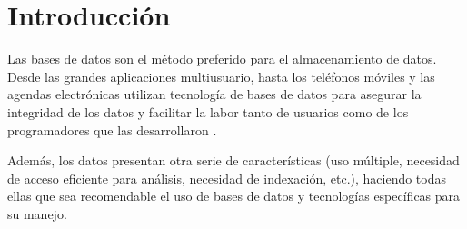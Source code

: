 \section{Introducción}

Las bases de datos son el método preferido para el almacenamiento de datos. Desde las grandes aplicaciones multiusuario, hasta los teléfonos
móviles y las agendas electrónicas utilizan tecnología de bases de datos para asegurar la integridad de los datos y facilitar la labor tanto de usuarios como de los
programadores que las desarrollaron \cite{ref1}. 

Además, los datos presentan otra serie de características (uso múltiple, necesidad de acceso eficiente para análisis, necesidad de indexación, etc.), haciendo todas ellas que sea recomendable el uso de bases de datos y tecnologías específicas para su manejo.